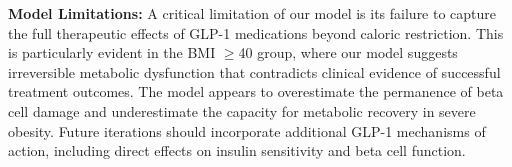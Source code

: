\textbf{Model Limitations:} A critical limitation of our model is its failure to capture the full therapeutic effects of GLP-1 medications beyond caloric restriction. This is particularly evident in the BMI $\geq$40 group, where our model suggests irreversible metabolic dysfunction that contradicts clinical evidence of successful treatment outcomes. The model appears to overestimate the permanence of beta cell damage and underestimate the capacity for metabolic recovery in severe obesity. Future iterations should incorporate additional GLP-1 mechanisms of action, including direct effects on insulin sensitivity and beta cell function.